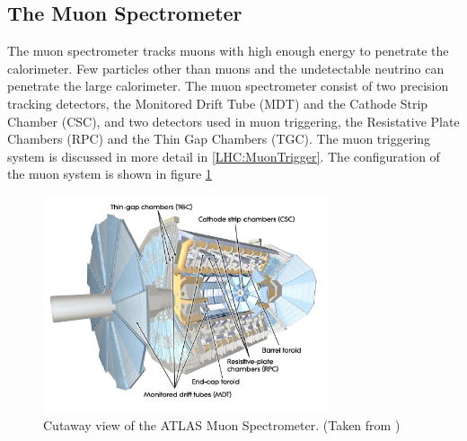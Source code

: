\subsection{The Muon Spectrometer}
\label{LHC:MuonSpec}
\indent The muon spectrometer tracks muons with high enough energy to penetrate the calorimeter. Few particles other than muons and the undetectable neutrino can penetrate the large calorimeter. The muon spectrometer consist of two precision tracking detectors, the Monitored Drift Tube (MDT) and the Cathode Strip Chamber (CSC), and two detectors used in muon triggering, the Resistative Plate Chambers (RPC) and the Thin Gap Chambers (TGC). The muon triggering system is discussed in more detail in \ref{LHC:MuonTrigger}. The configuration of the muon system is shown in figure \ref{LHC:fig:ATLASMuonSpec} ~\\
\begin{figure}[h!]
\centering
\includegraphics[width=0.75\textwidth, angle=0]{figures/DET/ATLAS_MuonSpec.PNG}
\caption{ Cutaway view of the ATLAS Muon Spectrometer. (Taken from \cite{biblio:JINST}) \label{LHC:fig:ATLASMuonSpec}}
\end{figure}

